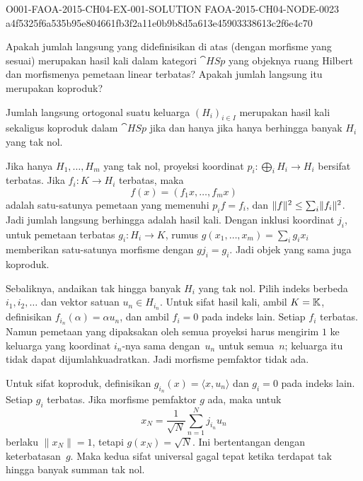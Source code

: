 \begin{o001solution}
  {O001-FAOA-2015-CH04-EX-001-SOLUTION}
  {FAOA-2015-CH04-NODE-0023}
  {a4f5325f6a535b95e804661fb3f2a11e0b9b8d5a613e45903338613c2f6e4c70}
\begin{o001statement}
 Apakah jumlah langsung yang didefinisikan di atas (dengan morfisme yang sesuai) merupakan hasil kali dalam kategori $\cat{HSp}$
yang objeknya ruang Hilbert dan morfismenya pemetaan linear terbatas?  Apakah jumlah langsung itu merupakan koproduk?
\end{o001statement}
\begin{o001answer}
Jumlah langsung ortogonal suatu keluarga $(H_i)_{i\in I}$ merupakan hasil kali
sekaligus koproduk dalam $\cat{HSp}$ jika dan hanya jika hanya berhingga banyak
$H_i$ yang tak nol.
\end{o001answer}
\begin{o001proof}
Jika hanya $H_1,\ldots,H_m$ yang tak nol, proyeksi koordinat
$p_i\colon\bigoplus_iH_i\to H_i$
bersifat terbatas. Jika $f_i\colon K\to H_i$ terbatas, maka
\[
 f(x)=(f_1x,\ldots,f_mx)
\]
adalah satu-satunya pemetaan yang memenuhi $p_i f=f_i$, dan
$\lVert f\rVert^2\leq\sum_i\lVert f_i\rVert^2$. Jadi jumlah langsung berhingga adalah
hasil kali. Dengan inklusi koordinat $j_i$, untuk pemetaan terbatas
$g_i\colon H_i\to K$, rumus
$g(x_1,\ldots,x_m)=\sum_i g_i x_i$ memberikan satu-satunya morfisme dengan
$g j_i=g_i$. Jadi objek yang sama juga koproduk.

Sebaliknya, andaikan tak hingga banyak $H_i$ yang tak nol. Pilih indeks
berbeda $i_1,i_2,\ldots$ dan vektor satuan $u_n\in H_{i_n}$. Untuk sifat
hasil kali, ambil $K=\mathbb{K}$, definisikan
$f_{i_n}(\alpha)=\alpha u_n$, dan ambil $f_i=0$ pada indeks lain. Setiap
$f_i$ terbatas. Namun pemetaan yang dipaksakan oleh semua proyeksi harus
mengirim $1$ ke keluarga yang koordinat $i_n$-nya sama dengan~$u_n$ untuk
semua~$n$; keluarga itu tidak dapat dijumlahkuadratkan. Jadi morfisme
pemfaktor tidak ada.

Untuk sifat koproduk, definisikan
$g_{i_n}(x)=\langle x,u_n\rangle$ dan $g_i=0$ pada indeks lain. Setiap
$g_i$ terbatas. Jika morfisme pemfaktor $g$ ada, maka untuk
\[
 x_N=\frac1{\sqrt N}\sum_{n=1}^{N}j_{i_n}u_n
\]
berlaku $\|x_N\|=1$, tetapi $g(x_N)=\sqrt N$. Ini bertentangan dengan
keterbatasan~$g$. Maka kedua sifat universal gagal tepat ketika terdapat tak
hingga banyak summan tak nol.
\end{o001proof}
\end{o001solution}

